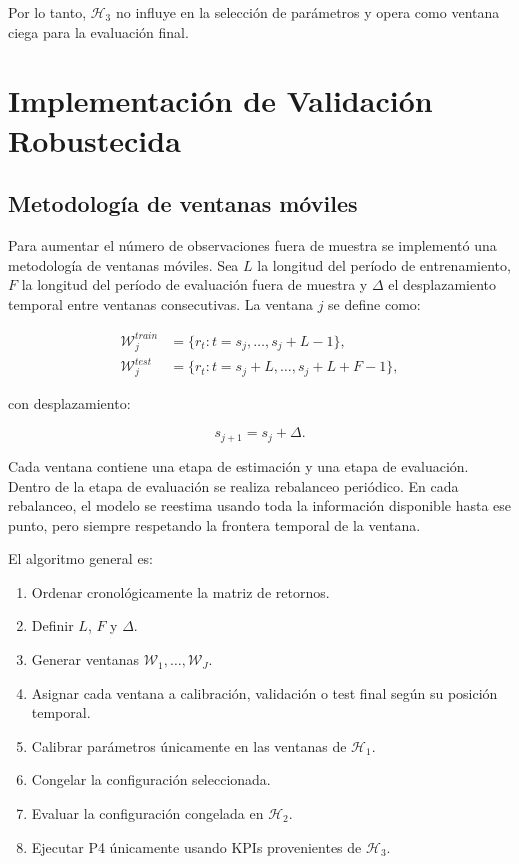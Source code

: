 \documentclass[11pt]{article}
\begin{document}
Por lo tanto, $\mathcal{H}_3$ no influye en la selecci\'on de par\'ametros y opera como ventana ciega para la evaluaci\'on final.

\section{Implementaci\'on de Validaci\'on Robustecida}

\subsection{Metodolog\'ia de ventanas m\'oviles}

Para aumentar el n\'umero de observaciones fuera de muestra se implement\'o una metodolog\'ia de ventanas m\'oviles. Sea $L$ la longitud del per\'iodo de entrenamiento, $F$ la longitud del per\'iodo de evaluaci\'on fuera de muestra y $\Delta$ el desplazamiento temporal entre ventanas consecutivas. La ventana $j$ se define como:

\begin{align}
    \mathcal{W}_j^{train}
    &=
    \{r_t : t = s_j,\dots,s_j+L-1\}, \\
    \mathcal{W}_j^{test}
    &=
    \{r_t : t = s_j+L,\dots,s_j+L+F-1\},
\end{align}

con desplazamiento:

\begin{equation}
    s_{j+1} = s_j + \Delta.
\end{equation}

Cada ventana contiene una etapa de estimaci\'on y una etapa de evaluaci\'on. Dentro de la etapa de evaluaci\'on se realiza rebalanceo peri\'odico. En cada rebalanceo, el modelo se reestima usando toda la informaci\'on disponible hasta ese punto, pero siempre respetando la frontera temporal de la ventana.

El algoritmo general es:

\begin{enumerate}
    \item Ordenar cronol\'ogicamente la matriz de retornos.
    \item Definir $L$, $F$ y $\Delta$.
    \item Generar ventanas $\mathcal{W}_1,\dots,\mathcal{W}_J$.
    \item Asignar cada ventana a calibraci\'on, validaci\'on o test final seg\'un su posici\'on temporal.
    \item Calibrar par\'ametros \'unicamente en las ventanas de $\mathcal{H}_1$.
    \item Congelar la configuraci\'on seleccionada.
    \item Evaluar la configuraci\'on congelada en $\mathcal{H}_2$.
    \item Ejecutar P4 \'unicamente usando KPIs provenientes de $\mathcal{H}_3$.
\end{enumerate}
\end{document}
